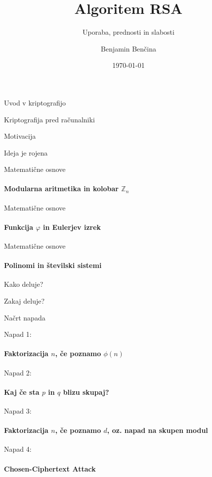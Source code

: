 \documentclass[a4paper, 12pt]{beamer} %
\title{Algoritem RSA}
\subtitle{Uporaba, prednosti in slabosti}
\author{Benjamin Benčina}
\institute{Fakulteta za matematiko in fiziko \\ Oddelek za matematiko}
\date{\today}
\newcommand{\Zn}{\mathbb{Z}_n}
\begin{document}
\titlepage

\begin{frame}{Uvod v kriptografijo}
\end{frame}

\begin{frame}{Kriptografija pred računalniki}
\end{frame}

\begin{frame}{Motivacija}
\end{frame}

\begin{frame}{Ideja je rojena}
\end{frame}

\begin{frame}{Matematične osnove}
\framesubtitle{Modularna aritmetika in kolobar $\Zn$}
\end{frame}

\begin{frame}{Matematične osnove}
\framesubtitle{Funkcija $\varphi$ in Eulerjev izrek}
\end{frame}

\begin{frame}{Matematične osnove}
\framesubtitle{Polinomi in številski sistemi}
\end{frame}

\begin{frame}{Kako deluje?}
\end{frame}

\begin{frame}{Zakaj deluje?}
\end{frame}

\begin{frame}{Načrt napada}
\end{frame}

\begin{frame}{Napad 1:}
\framesubtitle{Faktorizacija $n$, če poznamo $\phi(n)$}
\end{frame}

\begin{frame}{Napad 2:}
\framesubtitle{Kaj če sta $p$ in $q$ blizu skupaj?}
\end{frame}

\begin{frame}{Napad 3:}
\framesubtitle{Faktorizacija $n$, če poznamo $d$, oz. napad na skupen modul}
\end{frame}

\begin{frame}{Napad 4:}
\framesubtitle{Chosen-Ciphertext Attack}
\end{frame}
\end{document}

